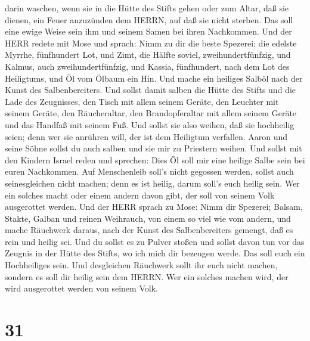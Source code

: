 darin waschen,  wenn sie in die Hütte des Stifts gehen oder
zum Altar, daß sie dienen, ein Feuer anzuzünden dem HERRN, 
auf daß sie nicht sterben. Das soll eine ewige Weise sein ihm und seinem
Samen bei ihren Nachkommen.  Und der HERR redete mit Mose
und sprach:  Nimm zu dir die beste Spezerei: die edelste
Myrrhe, fünfhundert Lot, und Zimt, die Hälfte soviel,
zweihundertfünfzig, und Kalmus, auch zweihundertfünfzig, 
und Kassia, fünfhundert, nach dem Lot des Heiligtums, und Öl vom Ölbaum
ein Hin.  Und mache ein heiliges Salböl nach der Kunst des
Salbenbereiters.  Und sollst damit salben die Hütte des
Stifts und die Lade des Zeugnisses,  den Tisch mit allem
seinem Geräte, den Leuchter mit seinem Geräte, den Räucheraltar,
 den Brandopferaltar mit allem seinem Geräte und das
Handfaß mit seinem Fuß.  Und sollst sie also weihen, daß
sie hochheilig seien; denn wer sie anrühren will, der ist dem Heiligtum
verfallen.  Aaron und seine Söhne sollst du auch salben und
sie mir zu Priestern weihen.  Und sollst mit den Kindern
Israel reden und sprechen: Dies Öl soll mir eine heilige Salbe sein bei
euren Nachkommen.  Auf Menschenleib soll's nicht gegossen
werden, sollst auch seinesgleichen nicht machen; denn es ist heilig,
darum soll's euch heilig sein.  Wer ein solches macht oder
einem andern davon gibt, der soll von seinem Volk ausgerottet werden.
 Und der HERR sprach zu Mose: Nimm dir Spezerei; Balsam,
Stakte, Galban und reinen Weihrauch, von einem so viel wie vom andern,
 und mache Räuchwerk daraus, nach der Kunst des
Salbenbereiters gemengt, daß es rein und heilig sei.  Und
du sollst es zu Pulver stoßen und sollst davon tun vor das Zeugnis in
der Hütte des Stifts, wo ich mich dir bezeugen werde. Das soll euch ein
Hochheiliges sein.  Und desgleichen Räuchwerk sollt ihr
euch nicht machen, sondern es soll dir heilig sein dem HERRN.
 Wer ein solches machen wird, der wird ausgerottet werden
von seinem Volk.

\hypertarget{section-30}{%
\section{31}\label{section-30}}

